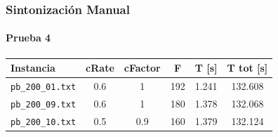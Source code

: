\frame
{
\frametitle{Sintonización Manual}
\framesubtitle{Prueba 4}
\begin{center}
\begin{tabular}{|l|c|c|c|c|c|}
    \hline
    \textbf{Instancia} & \textbf{cRate} & \textbf{cFactor} &\textbf{F} & \textbf{T [s]} & \textbf{T tot [s]}\\\hline
    \texttt{pb\_200\_01.txt} & 0.6 & 1   & 192 & 1.241 & 132.608 \\\hline
    \texttt{pb\_200\_09.txt} & 0.6 & 1   & 180 & 1.378 & 132.068 \\\hline
    \texttt{pb\_200\_10.txt} & 0.5 & 0.9 & 160 & 1.379 & 132.124 \\\hline
\end{tabular}
\end{center}
}
